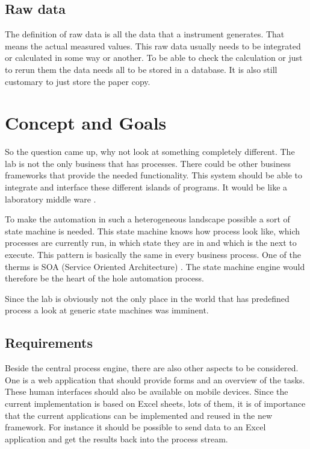 \documentclass[paper=a4,twoside=false,BCOR=0mm,DIV=calc,fontsize=12pt]{scrartcl}
\begin{document}
\subsection{Raw data}
The definition of raw data is all the data that a instrument generates. That means the actual measured values. 
This raw data usually needs to be integrated or calculated in some way or another. To be able to check the calculation or just to rerun them the data needs all to be stored in a database. It is also still customary to just store the paper copy.

\section{Concept and Goals}
So the question came up, why not look at something completely different. The lab is not the only business that has processes. There could be other business frameworks that provide the needed functionality. This system should be able to integrate and interface these different islands of programs. It would be like a laboratory middle ware \cite{middleware}. 

To make the automation in such a heterogeneous landscape possible a sort of state machine is needed. This state machine knows how process look like, which processes are currently run, in which state they are in and which is the next to execute.
This pattern is basically the same in every business process. One of the therms is SOA (Service Oriented Architecture) \cite{soa}. The state machine engine would therefore be the heart of the hole automation process.

Since the lab is obviously not the only place in the world that has predefined process a look at generic state machines was imminent.


\subsection{Requirements}
Beside the central process engine, there are also other aspects to be considered. One is a web application that should provide forms and an overview
of the tasks. These human interfaces should also be available on mobile devices.
Since the current implementation is based on Excel sheets, lots of them, it is of importance that the current applications can be implemented and reused in the new framework.
For instance it should be possible to send data to an Excel application and get the results back into the process stream.
\end{document}
